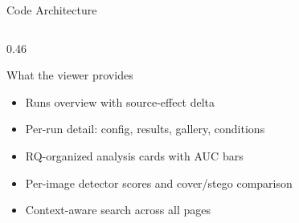 \documentclass[aspectratio=169,11pt]{beamer}
\begin{document}
\begin{frame}{Code Architecture}
\begin{columns}[T]
\begin{column}{0.46\textwidth}
\vspace{0.15cm}
\begin{block}{What the viewer provides}
\scriptsize
\begin{itemize}
  \item Runs overview with source-effect delta
  \item Per-run detail: config, results, gallery, conditions
  \item RQ-organized analysis cards with AUC bars
  \item Per-image detector scores and cover/stego comparison
  \item Context-aware search across all pages
\end{itemize}
\end{block}
\end{column}
\end{columns}
\end{frame}
\end{document}
